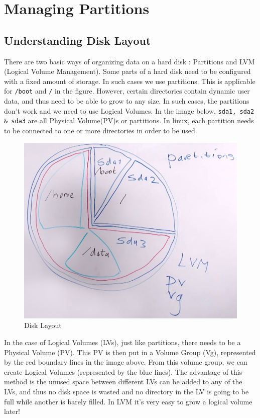 \chapter{Managing Partitions}

\section{Understanding Disk Layout}
There are two basic ways of organizing data on a hard disk : Partitions and LVM (Logical Volume Management). Some parts of a hard disk need to be configured with a fixed amount of storage. In such cases we use partitions. This is applicable for \verb|/boot| and \verb|/| in the figure. However, certain directories contain dynamic user data, and thus need to be able to grow to any size. In such cases, the partitions don't work and we need to use Logical Volumes. In the image below, \verb|sda1, sda2 & sda3| are all Physical Volume(PV)s or partitions. In linux, each partition needs to be connected to one or more directories in order to be used. 

\begin{figure}[H]
	\centering
	\includegraphics[width=0.9\linewidth]{RHCSA/Mod2/chapters/2.15.a}
	\caption{Disk Layout}
	\label{fig:2 Disk Layout}
\end{figure}


In the case of Logical Volumes (LVs), just like partitions, there needs to be a Physical Volume (PV). This PV is then put in a Volume Group (Vg), represented by the red boundary lines in the image above. From this volume group, we can create Logical Volumes (represented by the blue lines). The advantage of this method is the unused space between different LVs can be added to any of the LVs, and thus no disk space is wasted and no directory in the LV is going to be full while another is barely filled. In LVM it's very easy to grow a logical volume later!

